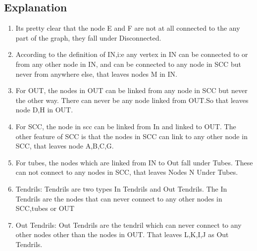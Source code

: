 \subsection{Explanation}
\begin{enumerate}
\item Its pretty clear that the node E and F are not at all connected to the any part of the graph, they fall under Disconnected. 
\item According to the definition of IN,i:e any vertex in IN can be connected to or from any other node in IN, and can be connected to any node in SCC but never from anywhere else, that leaves nodes M in IN.
\item For OUT, the nodes in OUT can be linked from any node in SCC but never the other way. There can never be any node linked from OUT.So that leaves node D,H in OUT.
\item For SCC, the node in scc can be linked from In and linked to OUT. The other feature of SCC is that the nodes in SCC can link to any other node in SCC, that leaves node A,B,C,G.
\item For tubes, the nodes which are linked from IN to Out fall under Tubes. These can not connect to any nodes in SCC, that leaves Nodes N Under Tubes.
\item Tendrils: Tendrils are two types In Tendrils and Out Tendrils. The In Tendrils are the nodes that can never connect to any other nodes in SCC,tubes or OUT
\item Out Tendrils: Out Tendrils are the tendril which can never connect to any other nodes other than the nodes in OUT. That leaves L,K,I,J as Out Tendrils. 
\end{enumerate}
